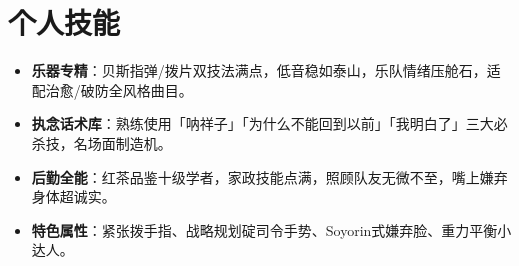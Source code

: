 \documentclass{resume}                      %
\begin{document}
\section{个人技能}
\begin{itemize}
    \item \textbf{乐器专精}：贝斯指弹/拨片双技法满点，低音稳如泰山，乐队情绪压舱石，适配治愈/破防全风格曲目。
    \item \textbf{执念话术库}：熟练使用「呐祥子」「为什么不能回到以前」「我明白了」三大必杀技，名场面制造机。
    \item \textbf{后勤全能}：红茶品鉴十级学者，家政技能点满，照顾队友无微不至，嘴上嫌弃身体超诚实。
    \item \textbf{特色属性}：紧张拨手指、战略规划碇司令手势、Soyorin式嫌弃脸、重力平衡小达人。
\end{itemize}
\end{document}
